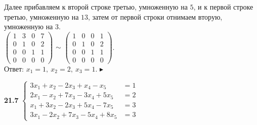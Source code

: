 \documentclass[a5paper,10pt]{article}
\begin{document}
Далее прибавляем к второй строке третью, умноженную на $5$, и к первой строке третью, умноженную на $13$, затем от первой строки отнимаем вторую, умноженную на $3$.\\[3pt]
$\left(\begin{array}{rrr|r}
1& 3& 0& 7\\
0& 1& 0& 2\\
0& 0& 1& 1\\
0& 0& 0& 0
\end{array}\right)$
$\sim$
$\left(\begin{array}{rrr|r}
1& 0& 0& 1\\
0& 1& 0& 2\\
0& 0& 1& 1\\
0& 0& 0& 0
\end{array}\right)$.
\\[3pt]
Ответ: $x_1=1,\ x_2=2,\ x_3=1$.
$\blacktriangleright$

\medskip
\noindent
{\bf 21.7}
$\begin{cases}
3x_1+x_2-2x_3+x_4-x_5&=1\\
2x_1-x_2+7x_3-3x_4+5x_5&=2\\
x_1+3x_2-2x_3+5x_4-7x_5&=3\\
3x_1-2x_2+7x_3-5x_4+8x_5&=3
\end{cases}$
\end{document}
